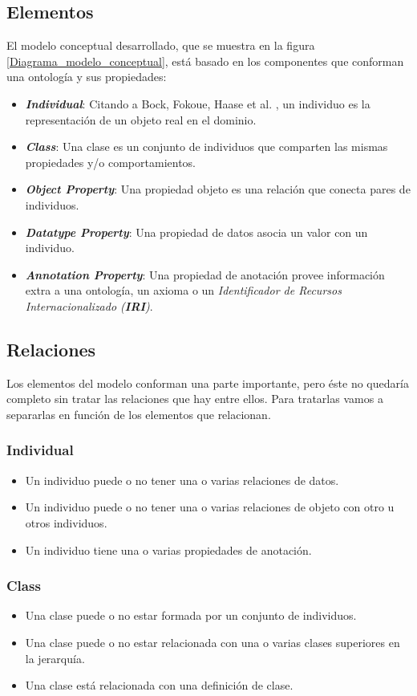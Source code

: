 \subsection{Elementos}\label{Elementos_modelo_conceptual}
El modelo conceptual desarrollado, que se muestra en la figura \ref{Diagrama_modelo_conceptual}, está basado en los componentes 
que conforman una ontología y sus propiedades:
\begin{itemize}
    \item \textit{\textbf{Individual}}: Citando a Bock, Fokoue, Haase et al. \autocite*{Bock2012}, un individuo es la 
    representación de un objeto real en el dominio.
    \item \textit{\textbf{Class}}: Una clase es un conjunto de individuos que comparten las mismas propiedades y/o 
    comportamientos.
    \item \textit{\textbf{Object Property}}: Una propiedad objeto es una relación que conecta pares de individuos.
    \item \textit{\textbf{Datatype Property}}: Una propiedad de datos asocia un valor con un individuo.
    \item \textit{\textbf{Annotation Property}}: Una propiedad de anotación provee información extra a una ontología, un axioma 
    o un \textit{Identificador de Recursos Internacionalizado (\textbf{IRI})}.
\end{itemize}

\subsection{Relaciones}
Los elementos del modelo conforman una parte importante, pero éste no quedaría completo sin tratar las relaciones que hay entre 
ellos. Para tratarlas vamos a separarlas en función de los elementos que relacionan.
\subsubsection{Individual}
\begin{itemize}
    \item Un individuo puede o no tener una o varias relaciones de datos.
    \item Un individuo puede o no tener una o varias relaciones de objeto con otro u otros individuos.
    \item Un individuo tiene una o varias propiedades de anotación.
\end{itemize}

\subsubsection{Class}
\begin{itemize}
    \item Una clase puede o no estar formada por un conjunto de individuos.
    \item Una clase puede o no estar relacionada con una o varias clases superiores en la jerarquía.
    \item Una clase está relacionada con una definición de clase.
\end{itemize}

